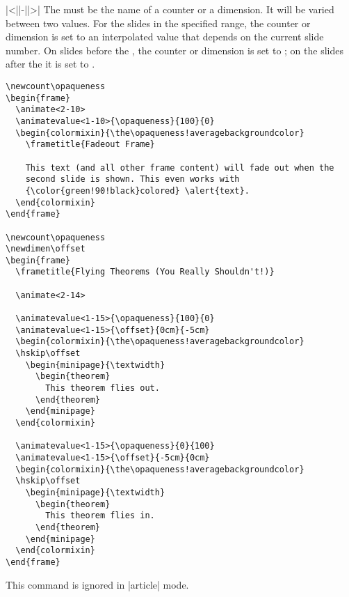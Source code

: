 \begin{command}{\animatevalue|<||-||>| }
  The  must be the name of a counter or a dimension. It will be varied between two values. For the slides in the specified range, the counter or dimension is set to an interpolated value that depends on the current slide number. On slides before the , the counter or dimension is set to ; on the slides after the  it is set to .

  \example
\begin{verbatim}
\newcount\opaqueness
\begin{frame}
  \animate<2-10>
  \animatevalue<1-10>{\opaqueness}{100}{0}
  \begin{colormixin}{\the\opaqueness!averagebackgroundcolor}
    \frametitle{Fadeout Frame}

    This text (and all other frame content) will fade out when the
    second slide is shown. This even works with
    {\color{green!90!black}colored} \alert{text}.
  \end{colormixin}
\end{frame}

\newcount\opaqueness
\newdimen\offset
\begin{frame}
  \frametitle{Flying Theorems (You Really Shouldn't!)}

  \animate<2-14>

  \animatevalue<1-15>{\opaqueness}{100}{0}
  \animatevalue<1-15>{\offset}{0cm}{-5cm}
  \begin{colormixin}{\the\opaqueness!averagebackgroundcolor}
  \hskip\offset
    \begin{minipage}{\textwidth}
      \begin{theorem}
        This theorem flies out.
      \end{theorem}
    \end{minipage}
  \end{colormixin}

  \animatevalue<1-15>{\opaqueness}{0}{100}
  \animatevalue<1-15>{\offset}{-5cm}{0cm}
  \begin{colormixin}{\the\opaqueness!averagebackgroundcolor}
  \hskip\offset
    \begin{minipage}{\textwidth}
      \begin{theorem}
        This theorem flies in.
      \end{theorem}
    \end{minipage}
  \end{colormixin}
\end{frame}
\end{verbatim}

  \articlenote
  This command is ignored in |article| mode.
\end{command}

